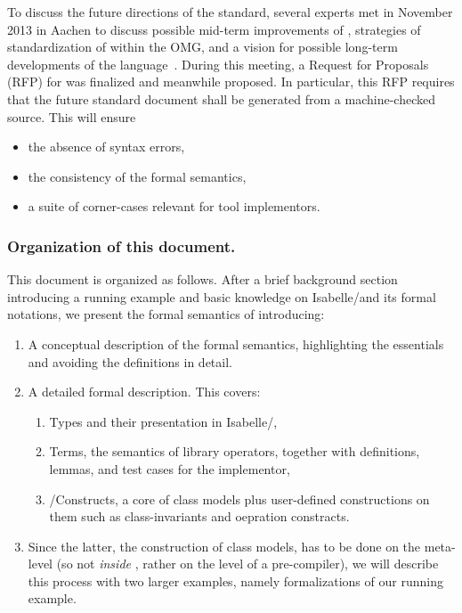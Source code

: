 To discuss the future directions of the standard, several \OCL experts met 
in November 2013 in Aachen to discuss possible mid-term improvements of \OCL, 
strategies of standardization of \OCL within the OMG, and a vision for possible
long-term developments of the
language~\cite{brucker.ea:summary-aachen:2013}. During this meeting, a
Request for Proposals (RFP) for  was finalized and meanwhile
proposed. In particular, this RFP requires that the future 
standard document shall be generated from a machine-checked
source. This will ensure
\begin{itemize}
\item the absence of syntax errors,
\item the consistency of the formal semantics,
\item a suite of corner-cases relevant for \OCL tool implementors.
\end{itemize}

\subsubsection{Organization of this document.}
This document is organized as follows. After a brief background section
introducing a running example and basic knowledge on Isabelle/\HOL and its formal
notations, we present the formal semantics of  \FOCL introducing:
\begin{enumerate}
\item A conceptual description of the formal semantics, highlighting the essentials
      and avoiding the definitions in detail.
\item A detailed formal description. This covers:
\begin{enumerate}
\item \OCL Types and their presentation in Isabelle/\HOL,
\item \OCL Terms, \ie{} the semantics of library operators, 
        together with definitions, lemmas, and test cases for the implementor,
\item \UML/\OCL Constructs, \ie{} a core of \UML class models plus user-defined
        constructions on them such as class-invariants and oepration constracts.
\end{enumerate}
\item Since the latter, \ie{} the construction of \UML class models, has to be done on the meta-level
(so not \emph{inside} \HOL, rather on the level of a pre-compiler), we will describe this process
with two larger examples, namely formalizations of our running example.
\end{enumerate}
       

